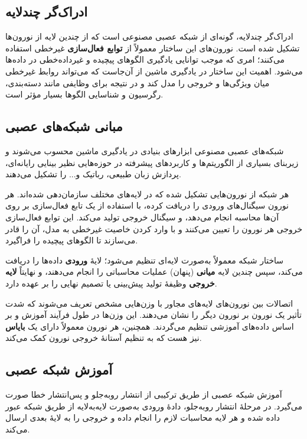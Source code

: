 \subsection*{ادراک‌گر چندلایه}

ادراک‌گر چندلایه، گونه‌ای از شبکه عصبی مصنوعی است که از چندین لایه از نورون‌ها تشکیل شده است. نورون‌های این ساختار معمولاً از \textbf{توابع فعال‌سازی} غیرخطی استفاده می‌کنند؛ امری که موجب توانایی یادگیری الگوهای پیچیده و غیرداده‌خطی در داده‌ها می‌شود. اهمیت این ساختار در یادگیری ماشین از آن‌جاست که می‌تواند روابط غیرخطی میان ویژگی‌ها و خروجی را مدل کند و در نتیجه برای وظایفی مانند دسته‌بندی، رگرسیون و شناسایی الگوها بسیار مؤثر است.

\subsection*{مبانی شبکه‌های عصبی}

شبکه‌های عصبی مصنوعی ابزارهای بنیادی در یادگیری ماشین محسوب می‌شوند و زیربنای بسیاری از الگوریتم‌ها و کاربردهای پیشرفته در حوزه‌هایی نظیر بینایی رایانه‌ای، پردازش زبان طبیعی، رباتیک و... را تشکیل می‌دهند.

هر شبکه از نورون‌هایی تشکیل شده که در لایه‌های مختلف سازمان‌دهی شده‌اند. هر نورون سیگنال‌های ورودی را دریافت کرده، با استفاده از یک تابع فعال‌سازی بر روی آن‌ها محاسبه انجام می‌دهد، و سیگنال خروجی تولید می‌کند. این توابع فعال‌سازی خروجی هر نورون را تعیین می‌کنند و با وارد کردن خاصیت غیرخطی به مدل، آن را قادر می‌سازند تا الگوهای پیچیده را فراگیرد.

ساختار شبکه معمولاً به‌صورت لایه‌ای تنظیم می‌شود؛ لایهٔ \textbf{ورودی} داده‌ها را دریافت می‌کند، سپس چندین لایه \textbf{میانی} (پنهان) عملیات محاسباتی را انجام می‌دهند، و نهایتاً \textbf{لایه خروجی} وظیفهٔ تولید پیش‌بینی یا تصمیم نهایی را بر عهده دارد.

اتصالات بین نورون‌های لایه‌های مجاور با وزن‌هایی مشخص تعریف می‌شوند که شدت تأثیر یک نورون بر نورون دیگر را نشان می‌دهند. این وزن‌ها در طول فرآیند آموزش و بر اساس داده‌های آموزشی تنظیم می‌گردند. همچنین، هر نورون معمولاً دارای یک \textbf{بایاس} نیز هست که به تنظیم آستانهٔ خروجی نورون کمک می‌کند.

\subsection*{آموزش شبکه عصبی}

آموزش شبکه عصبی از طریق ترکیبی از انتشار روبه‌جلو و پس‌انتشار خطا صورت می‌گیرد. در مرحلهٔ انتشار روبه‌جلو، دادهٔ ورودی به‌صورت لایه‌به‌لایه از طریق شبکه عبور داده شده و هر لایه محاسبات لازم را انجام داده و خروجی را به لایهٔ بعدی ارسال می‌کند.

